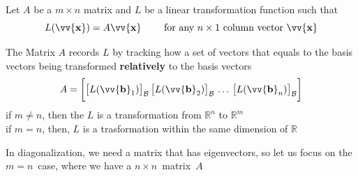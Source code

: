 \documentclass[11pt]{article}
\DeclareRobustCommand{\myvec}[1]{\vv{\mathbf{#1}}}
\newcommand{\myset}[1]{\mathcal{#1}}
\newcommand{\mymat}[1]{#1}
\begin{document}
    Let $\mymat{A}$ be a $m \times n$ matrix and $L$ be a linear transformation function such that
    \[ \mymat{L}(\myvec{x}) = \mymat{A}\myvec{x} \qquad \text{ for any }n \times 1\text{ column vector }\myvec{x} \]
    
    The Matrix $\mymat{A}$ records $\mymat{L}$ by tracking how a set of vectors that equals to the basis vectors being transformed \textbf{relatively} to the basis vectors \\
    
    \begin{equation}
        \mymat{A} = \bigg[ \big[\mymat{L}(\myvec{b}_1)\big]_{\myset{B}} \, \big[\mymat{L}(\myvec{b}_2)\big]_{\myset{B}} \, \dots \, \big[\mymat{L}(\myvec{b}_n)\big]_{\myset{B}} \bigg]
    \end{equation}
    if $m \ne n$, then the $\mymat{L}$ is a transformation from $\mathbb{R}^n$ to $\mathbb{R}^m$\\
    if $m = n$, then, $\mymat{L}$ is a trasformation within the same dimension of $\mathbb{R}$
    \vspace{1ex}

    In diagonalization, we need a matrix that has eigenvectors, so let us focus on the $m = n$~case, where we have a $n \times n$~matrix~$\mymat{A}$
\end{document}

